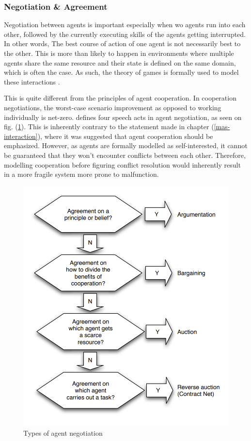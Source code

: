 \documentclass[main.tex]{subfiles}
\begin{document}
\subsubsection{Negotiation \& Agreement}
Negotiation between agents is important especially when wo agents run into each other, 
followed by the currently executing skills of the agents getting interrupted. In other words, 
The best course of action of one agent is not necessarily best to the other. This is more than
likely to happen in environments where multiple agents share the same resource and their state
is defined on the same domain, which is often the case. As such, the theory of games is formally 
used to model these interactions \cite{Binder2022}. 

This is quite different from the principles of agent cooperation. In cooperation negotiations, 
the worst-case scenario improvement as opposed to working individually is net-zero. \cite{Binder2022}
defines four speech acts in agent negotiation, as seen on fig. (\ref{fig-speech-acts}). This is 
inherently contrary to the statement made in chapter (\ref{mas-interaction}), where it was suggested 
that agent cooperation should be emphasized. However, as agents are formally modelled as self-interested, 
it cannot be guaranteed that they won't encounter conflicts between each other. Therefore, modelling 
cooperation before figuring conflict resolution would inherently result in a more fragile system 
more prone to malfunction. 

\begin{figure}[htbp]
    \centering
    \includegraphics[width=.8\textwidth]{speech-acts.png}
    \caption{Types of agent negotiation \cite{Binder2022}}
    \label{fig-speech-acts}
\end{figure}
\end{document}
